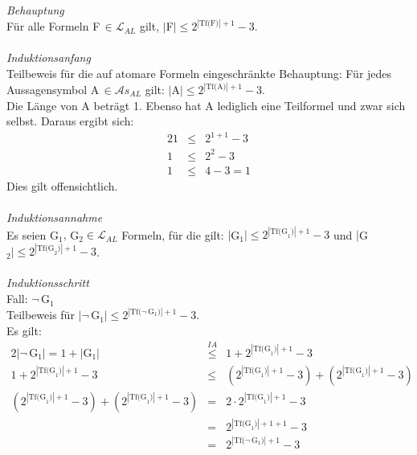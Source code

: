 \documentclass[10pt,a4paper,oneside,ngerman,numbers=noenddot]{scrartcl}
\begin{document}
\section{} %
\textit{Behauptung}\\
Für alle Formeln F$\, \in \mathcal{L}_{AL}$ gilt, $|$F$| \leq 2^{|\text{Tf(F)}|+1}-3$.\\
\\
\textit{Induktionsanfang}\\
Teilbeweis für die auf atomare Formeln eingeschränkte Behauptung: Für jedes Aussagensymbol
A$\, \in \mathcal{A}s_{AL}$ gilt: $|$A$| \leq 2^{|\text{Tf(A)}|+1}-3$.\\
Die Länge von A beträgt 1. Ebenso hat A lediglich eine Teilformel und zwar sich selbst. Daraus ergibt sich:\\
\begin{alignat*}{2}
1 &\leq & 2^{1 + 1}-3 \\
1 &\leq & 2^{2} - 3 \\
1 &\leq & 4-3 = 1
\end{alignat*}
Dies gilt offensichtlich.\\
\\
\textit{Induktionsannahme}\\
Es seien G$_{1}, \,$G$_{2} \in \mathcal{L}_{AL}$ Formeln, für die gilt: $|$G$_{1}| \leq 2^{|\text{Tf(G}_{1}\text{)}|+1}-3$ und $|$G$_{2}| \leq 2^{|\text{Tf(G}_{2}\text{)}|+1}-3$.\\
\\
\textit{Induktionsschritt}\\
Fall: $\neg \,$G$_{1}$\\
Teilbeweis für $|\neg \,$G$_{1}| \leq 2^{|\text{Tf(}\neg \,\text{G}_{1}\text{)}|+1}-3$.\\
Es gilt:\\
\begin{alignat*}{2}
|\neg \,\text{G}_{1}| = 1 + |\text{G}_{1}| &\overset{IA}{\leq} & 1 + 2^{|\text{Tf(G}_{1}\text{)}|+1}-3 \\
1 + 2^{|\text{Tf(G}_{1}\text{)}|+1}-3 &\leq & \left(2^{|\text{Tf(G}_{1}\text{)}|+1}-3\right) + \left(2^{|\text{Tf(G}_{1}\text{)}|+1}-3\right) \\
\left(2^{|\text{Tf(G}_{1}\text{)}|+1}-3\right) + \left(2^{|\text{Tf(G}_{1}\text{)}|+1}-3\right) &=&
2\cdot 2^{|\text{Tf(G}_{1}\text{)}|+1}-3 \\
&=& 2^{|\text{Tf(G}_{1}\text{)}|+1+1}-3 \\
&=& 2^{|\text{Tf(}\neg \,\text{G}_{1}\text{)}|+1}-3
\end{alignat*}
\end{document}
